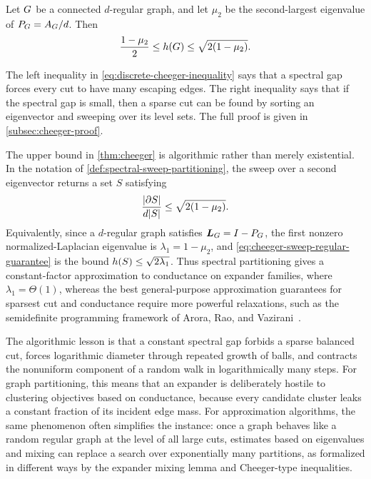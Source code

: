 \begin{theorem}
	\label{thm:cheeger}
	Let \(G\) be a connected \(d\)-regular graph, and let \(\mu_2\) be the second-largest eigenvalue of \(P_{G}=A_{G}/d\). Then
	\begin{equation}
		\label{eq:discrete-cheeger-inequality}
		\frac{1-\mu_2}{2}\leq h(G)\leq \sqrt{2(1-\mu_2)}.
	\end{equation}
\end{theorem}

The left inequality in \cref{eq:discrete-cheeger-inequality} says that a spectral gap forces every cut to have many escaping edges. The right inequality says that if the spectral gap is small, then a sparse cut can be found by sorting an eigenvector and sweeping over its level sets. The full proof is given in \cref{subsec:cheeger-proof}.

The upper bound in \cref{thm:cheeger} is algorithmic rather than merely existential. In the notation of \cref{def:spectral-sweep-partitioning}, the sweep over a second eigenvector returns a set \(S\) satisfying
\begin{equation}
	\label{eq:cheeger-sweep-regular-guarantee}
	\frac{\lvert\partial S\rvert}{d\lvert S\rvert}\leq \sqrt{2(1-\mu_2)}.
\end{equation}
Equivalently, since a \(d\)-regular graph satisfies \(\boldsymbol{L}_{G}=I-P_{G}\), the first nonzero normalized-Laplacian eigenvalue is \(\lambda_1=1-\mu_2\), and \cref{eq:cheeger-sweep-regular-guarantee} is the bound \(h(S)\leq\sqrt{2\lambda_1}\). Thus spectral partitioning gives a constant-factor approximation to conductance on expander families, where \(\lambda_1=\Theta(1)\), whereas the best general-purpose approximation guarantees for sparsest cut and conductance require more powerful relaxations, such as the semidefinite programming framework of Arora, Rao, and Vazirani~\cite{ARV2009}.

 The algorithmic lesson is that a constant spectral gap forbids a sparse balanced cut, forces logarithmic diameter through repeated growth of balls, and contracts the nonuniform component of a random walk in logarithmically many steps. For graph partitioning, this means that an expander is deliberately hostile to clustering objectives based on conductance, because every candidate cluster leaks a constant fraction of its incident edge mass. For approximation algorithms, the same phenomenon often simplifies the instance: once a graph behaves like a random regular graph at the level of all large cuts, estimates based on eigenvalues and mixing can replace a search over exponentially many partitions, as formalized in different ways by the expander mixing lemma and Cheeger-type inequalities.
